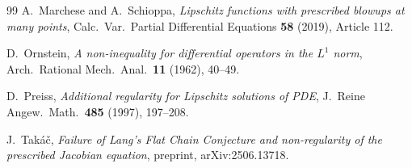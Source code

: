 \documentclass[11pt,a4paper]{article}
\theoremstyle{definition}
\theoremstyle{remark}
\begin{document}
\begin{thebibliography}{99}
A.~Marchese and A.~Schioppa,
\newblock \emph{Lipschitz functions with prescribed blowups at many points},
\newblock Calc.\ Var.\ Partial Differential Equations \textbf{58} (2019), Article 112.

D.~Ornstein,
\newblock \emph{A non-inequality for differential operators in the $L^1$ norm},
\newblock Arch.\ Rational Mech.\ Anal.\ \textbf{11} (1962), 40--49.

D.~Preiss,
\newblock \emph{Additional regularity for Lipschitz solutions of PDE},
\newblock J.\ Reine Angew.\ Math.\ \textbf{485} (1997), 197--208.

J.~Tak\'a\v{c},
\newblock \emph{Failure of Lang's Flat Chain Conjecture and non-regularity of the prescribed Jacobian equation},
\newblock preprint, arXiv:2506.13718.

\end{thebibliography}
\end{document}

